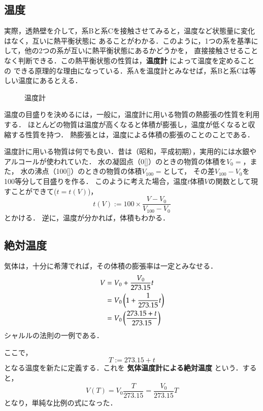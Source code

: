     \subsection{温度}
        実際，透熱壁を介して，系Bと系Cを接触させてみると，温度など状態量に変化はなく，互いに熱平衡状態に
        あることがわかる．このように，1つの系を基準にして，他の2つの系が互いに熱平衡状態にあるかどうかを，
        直接接触させることなく判断できる．この熱平衡状態の性質は，\textbf{温度計} によって温度を定めることの
        できる原理的な理由になっている．系Aを温度計とみなせば，系Bと系Cは等しい温度にあるとえる．
        \begin{figure}[hbt]
            \begin{center}
                \caption{温度計}
                \label{fig:netsurikigaku_ondokei}
            \end{center}
        \end{figure}

        温度の目盛りを決めるには，一般に，温度計に用いる物質の熱膨張の性質を利用する．
        ほとんどの物質は温度が高くなると体積が膨張し，温度が低くなると収縮する性質を持つ．
        熱膨張とは，温度による体積の膨張のことのことである．

        温度計に用いる物質は何でも良い．昔は（昭和，平成初期），実用的には水銀やアルコールが使われていた．
        水の凝固点（0[\circC]）のときの物質の体積を${V}_{0}=$，また，
        水の沸点（100[\circC]）のときの物質の体積${V}_{100}=$として，
        その差${V}_{100}-{V}_{0}$を100等分して目盛りを作る．
        このように考えた場合，温度$t$体積$V$の関数として現すことができて($t=t(V)$)，
        \begin{equation}
            t(V) := 100 \times \frac{V-{V}_{0}}{{V}_{100}-{V}_{0}}
        \end{equation}
        とかける．
        逆に，温度が分かれば，体積もわかる．

    \subsection{絶対温度}
        気体は，十分に希薄でれば，その体積の膨張率は一定とみなせる．
        \begin{align}
            V &= {V}_{0} + \frac{{V}_{0}}{273.15}t  \notag \\
              &= {V}_{0}\left( 1 + \frac{1}{273.15}t \right) \notag \\
              &= {V}_{0}\left(  \frac{273.15 + t}{273.15} \right)
        \end{align}
        シャルルの法則の一例である．

        ここで，
        \begin{equation}
            T := 273.15 + t
        \end{equation}
        となる温度を新たに定義する．これを \textbf{気体温度計による絶対温度} という．すると，
        \begin{equation}
            V(T) = {V}_{0} \frac{T}{273.15} = \frac{{V}_{0}}{273.15}T
        \end{equation}
        となり，単純な比例の式になった．
